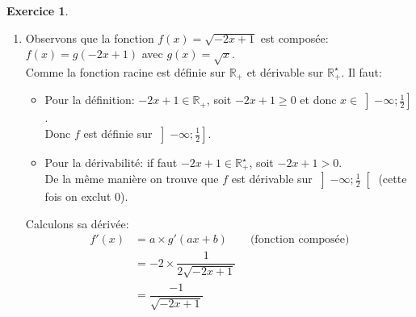 \documentclass{exam}
\theoremstyle{definition}
\newtheorem{exercice}{Exercice}
\begin{document}
\begin{exercice}
\begin{enumerate}
\begin{align*}
\begin{cases}
            v = x + 1 & v' = 1
        \end{cases}
        \end{align*}
        Sa dérivée est donc:
        \begin{align*}
            f'(x) &= \frac{u'v - uv'}{v^2} \qquad \text{(produit de deux fonctions $(uv)'$)}\\
            &= \frac{\frac{1}{2\sqrt{x}}(x + 1) - \sqrt{x}\times1}{(x + 1)^2}\\
            &= \frac{\frac{\sqrt{x}}{2x}(x+1) - 2x\frac{\sqrt{x}}{2x}}{(x + 1)^2}\\
            &= \frac{\frac{\sqrt{x}}{2x}(x + 1 - 2x)}{(x+1)^2}\\
            &= \frac{\sqrt{x}(1 - x)}{2x(x+1)^2}\\
            &= \frac{1 - x}{2\sqrt{x}(x + 1)^2}
        \end{align*}
        \item Observons que la fonction $f(x) = \sqrt{-2x + 1}$ est composée: $f(x) = g(-2x + 1)$ avec $g(x) = \sqrt{x}$.\\
        Comme la fonction racine est définie sur $\mathbb{R}_+$ et dérivable sur $\mathbb{R}_+^\star$. Il faut:
        \begin{itemize}
            \item Pour la définition: $-2x + 1 \in \mathbb{R}_+$, soit $-2x + 1 \geq 0$ et donc $x \in \left]-\infty; \frac{1}{2}\right]$.\\ Donc $f$ est définie sur $\left]-\infty; \frac{1}{2}\right]$.
            \item Pour la dérivabilité: if faut $-2x + 1 \in \mathbb{R}_+^\star$, soit $-2x + 1 > 0$.\\
            De la même manière on trouve que $f$ est dérivable sur $\left]-\infty; \frac{1}{2}\right[$ (cette fois on exclut $0$).
        \end{itemize}
        Calculons sa dérivée:
        \begin{align*}
            f'(x) &= a \times g'(ax + b) \qquad \text{(fonction composée)}\\
            &= -2 \times \dfrac{1}{2\sqrt{-2x+1}}\\
            &= \dfrac{-1}{\sqrt{-2x + 1}}
        \end{align*}
    \end{enumerate}
\end{exercice}
\end{document}
